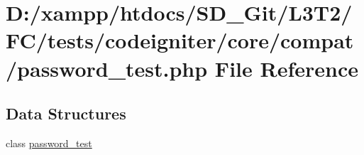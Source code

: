 \hypertarget{password__test_8php}{}\section{D\+:/xampp/htdocs/\+S\+D\+\_\+\+Git/\+L3\+T2/\+F\+C/tests/codeigniter/core/compat/password\+\_\+test.php File Reference}
\label{password__test_8php}
\subsection*{Data Structures}
\begin{DoxyCompactItemize}
\item 
class \hyperlink{classpassword__test}{password\+\_\+test}
\end{DoxyCompactItemize}
